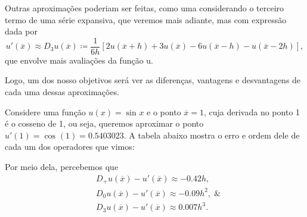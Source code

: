 \documentclass[../differential_methods.tex]{subfiles}
\begin{document}
Outras aproximações poderiam ser feitas, como uma considerando o terceiro termo de uma série expansiva, que veremos mais adiante, mas com expressão dada por
\[
	u'(\overline{x})\approx D_{3}u(\overline{x})\coloneqq \frac{1}{6h}[2u(\overline{x}+h)+3u(\overline{x})-6u(\overline{x}-h)-u(\overline{x}-2h)],
\]
que envolve mais avaliações da função u.

Logo, um dos nosso objetivos será ver as diferenças, vantagens e desvantagens de cada uma dessas aproximações.

\begin{example}
	Considere uma função \(u(x)=\sin^{}{x}\) e o ponto \(\overline{x}=1\), cuja derivada no ponto 1 é o cosseno de 1, ou seja, queremos aproximar o ponto \(u'(1)=\cos^{}{(1)}=0.5403023\). A tabela abaixo mostra o erro e ordem dele de cada um dos operadores que vimos:
	\begin{table}[H]
		\centering
		\caption{erros em cada uma das diferentes aproximações finitas de \(u'(x).\)}
	\end{table}

	Por meio dela, percebemos que
	\begin{align*}
		 & D_{+}u(\overline{x})-u'(\overline{x})\approx -0.42h,          \\
		 & D_{0}u(\overline{x})-u'(\overline{x})\approx -0.09h^{2}, \;\& \\
		 & D_{3}u(\overline{x})-u'(\overline{x})\approx 0.007h^{3}.
	\end{align*}


\end{example}
\end{document}
